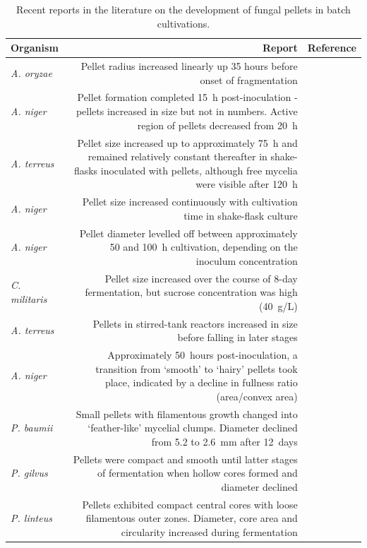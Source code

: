 \begin{table}[htbp]
	\centering
	\footnotesize
	\caption{Recent reports in the literature on the development of fungal pellets in batch cultivations.}
	\label{tab:PelletBatchLit}
	\begin{tabularx}{(\textwidth - 1cm)}{l R c}
		\toprule
		Organism & Report & Reference \\ \midrule
		\emph{A. oryzae} & Pellet radius increased linearly up 35 hours before onset of fragmentation & \cite{carlsen1996a}\\
		\emph{A. niger} & Pellet formation completed 15~h post-inoculation - pellets increased in size but not in numbers. Active region of pellets decreased from 20~h & \cite{elenshasy2006}\\
		 \emph{A. terreus} & Pellet size increased up to approximately 75~h and remained relatively constant thereafter in shake-flasks inoculated with pellets, although free mycelia were visible after 120~h & \cite{bizukojc2009}\\
		 \emph{A. niger} & Pellet size increased continuously with cultivation time in shake-flask culture & \cite{papagianni2004}\\
		 \emph{A. niger} & Pellet diameter levelled off between approximately 50 and 100~h cultivation, depending on the inoculum concentration & \cite{papagianni2002}\\
		 \emph{C. militaris} & Pellet size increased over the course of 8-day fermentation, but sucrose concentration was high (40~g/L) & \cite{jppark2002}\\
		 \emph{A. terreus} & Pellets in stirred-tank reactors increased in size before falling in later stages & \cite{rodriguezporcel2005}\\
		 \emph{A. niger} & Approximately 50~hours post-inoculation, a transition from \lq smooth' to \lq hairy' pellets took place, indicated by a decline in fullness ratio (area/convex area) & \cite{paul1998}\\
		 \emph{P. baumii} & Small pellets with filamentous growth changed into \lq feather-like' mycelial clumps. Diameter declined from 5.2 to 2.6~mm after 12~days & \cite{hwang2004}\\
		 \emph{P. gilvus} & Pellets were compact and smooth until latter stages of fermentation when hollow cores formed and diameter declined & \cite{hwang2004}\\
		 \emph{P. linteus} & Pellets exhibited compact central cores with loose filamentous outer zones. Diameter, core area and circularity increased during fermentation & \cite{hwang2004}\\
		\bottomrule
	\end{tabularx}
\end{table}

